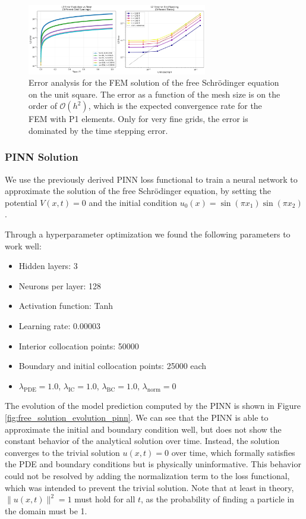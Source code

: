\documentclass{article}
\theoremstyle{definition}
\theoremstyle{plain}
\theoremstyle{remark}
\begin{document}
\begin{figure}[h!]
  \centering
  \includegraphics[width=0.7\textwidth, trim=19cm 0cm 0cm 0cm, clip]{figures/2d_error_analysis.png}
  \caption{Error analysis for the FEM solution of the free Schrödinger equation on the unit square. The error as a function of the mesh size is on the order of $\mathcal{O}(h^2)$, which is the expected convergence rate for the FEM with P1 elements. Only for very fine grids, the error is dominated by the time stepping error.}
  \label{fig:2d_error_analysis_2}
\end{figure}

\subsubsection*{PINN Solution}

We use the previously derived PINN loss functional to train a neural network to approximate the solution of the free Schrödinger equation, by setting the potential \( V(x,t) = 0 \) and the initial condition \( u_0(x) = \sin(\pi x_1)\sin(\pi x_2) \).

Through a hyperparameter optimization we found the following parameters to work well:

\begin{itemize}
  \item Hidden layers: 3
  \item Neurons per layer: 128
  \item Activation function: Tanh
  \item Learning rate: 0.00003
  \item Interior collocation points: 50000
  \item Boundary and initial collocation points: 25000 each
  \item $\lambda_{\mathrm{PDE}} = 1.0$, $\lambda_{\mathrm{IC}} = 1.0$, $\lambda_{\mathrm{BC}} = 1.0$, $\lambda_{\mathrm{norm}} = 0$
\end{itemize}

The evolution of the model prediction computed by the PINN is shown in Figure \ref{fig:free_solution_evolution_pinn}. We can see that the PINN is able to approximate the initial and boundary condition well, but does not show the constant behavior of the analytical solution over time. Instead, the solution converges to the trivial solution \( u(x,t) = 0 \) over time, which formally satisfies the PDE and boundary conditions but is physically uninformative. This behavior could not be resolved by adding the normalization term to the loss functional, which was intended to prevent the trivial solution. Note that at least in theory, $\|u(x,t)\|^2 = 1$ must hold for all $t$, as the probability of finding a particle in the domain must be 1.
\end{document}
